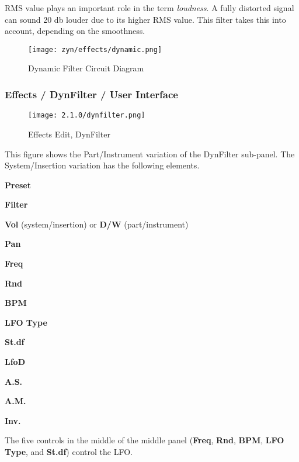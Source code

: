    RMS value plays an important role in the term \textsl{loudness}.
   A fully distorted signal can sound 20 db louder due to its higher RMS value.
   This filter takes this into account, depending on the smoothness.

\begin{figure}[H]
   \centering
   \texttt{[image: zyn/effects/dynamic.png]}
   \caption{Dynamic Filter Circuit Diagram}
   \label{fig:dynfilter_circuit_diagram}
\end{figure}

\subsubsection{Effects / DynFilter / User Interface}
\label{subsubsec:effects_edit_dynfilter_ui}

\begin{figure}[H]
   \centering
   \texttt{[image: 2.1.0/dynfilter.png]}
   \caption{Effects Edit, DynFilter}
   \label{fig:effects_edit_dynfilter}
\end{figure}

   This figure shows the Part/Instrument variation of the DynFilter sub-panel.
   The System/Insertion variation has the following elements.

   \begin{enumber}
      \item \textbf{Preset}
      \item \textbf{Filter}
      \item \textbf{Vol} (system/insertion) or \textbf{D/W} (part/instrument)
      \item \textbf{Pan}
      \item \textbf{Freq}
      \item \textbf{Rnd}
      \item \textbf{BPM}
      \item \textbf{LFO Type}
      \item \textbf{St.df}
      \item \textbf{LfoD}
      \item \textbf{A.S.}
      \item \textbf{A.M.}
      \item \textbf{Inv.}
   \end{enumber}

   The five controls in the middle of the middle panel
   (\textbf{Freq}, \textbf{Rnd}, \textbf{BPM}, \textbf{LFO Type}, and \textbf{St.df})
   control the LFO.

